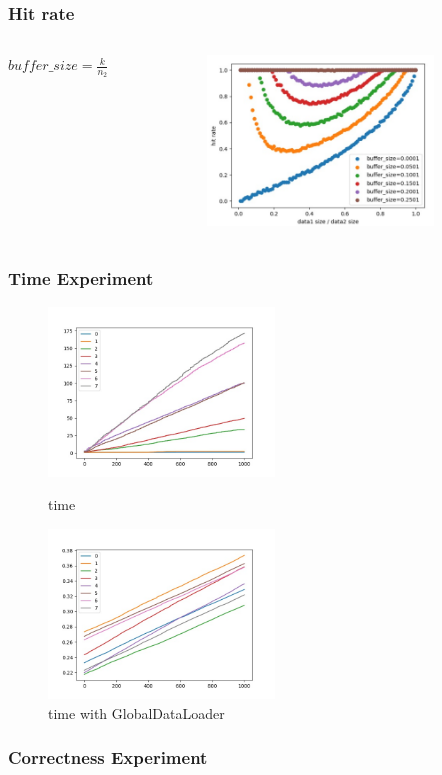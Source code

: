 \documentclass[notheorems, aspectratio=54]{beamer}
\begin{document}
\begin{frame}
    \frametitle{Hit rate}
    \begin{columns}
        \begin{column}{0.48\textwidth}
            $buffer\_size = \frac{k}{n_2}$
        \end{column}
        \begin{column}{0.48\textwidth}
            \begin{figure}
                \centering
                \includegraphics[width=6cm]{global_img_dir/buffer_size.png}
                \caption{}
            \end{figure}
        \end{column}
    \end{columns}
\end{frame}

\begin{frame}
    \frametitle{Time Experiment}
    \begin{figure}[htbp]
        \centering
        \begin{minipage}[t]{0.48\textwidth}
        \centering
        \includegraphics[width=6cm]{global_img_dir/l.jpg}
        \caption{time}
        \end{minipage}
        \begin{minipage}[t]{0.48\textwidth}
        \centering
        \includegraphics[width=6cm]{global_img_dir/gl.jpg}
        \caption{time with GlobalDataLoader}
        \end{minipage}
    \end{figure}
\end{frame}

\begin{frame}
    \frametitle{Correctness  Experiment}
\end{frame}
\end{document}
